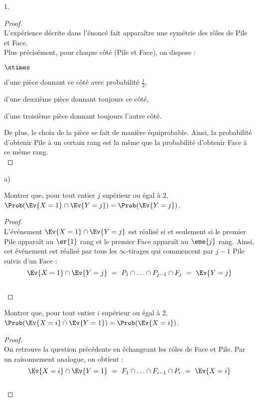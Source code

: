 \begin{noliste}{1.}
  \begin{proof}~\\%
    L'expérience décrite dans l'énoncé fait apparaître une symétrie
    des rôles de Pile et Face.\\
    Plus précisément, pour chaque côté (Pile et Face), on dispose :
    \begin{noliste}{$\stimes$}
    \item d'une pièce donnant ce côté avec probabilité $\frac{1}{2}$,
    \item d'une deuxième pièce donnant toujours ce côté,
    \item d'une troisième pièce donnant toujours l'autre côté.
    \end{noliste}
    De plus, le choix de la pièce se fait de manière
    équiprobable. Ainsi, la probabilité d'obtenir Pile à un certain
    rang est la même que la probabilité d'obtenir Face à ce même
    rang.%
    ~\\[-1cm]
  \end{proof}

\item
  \begin{noliste}{a)}
    \setlength{\itemsep}{2mm}
  \item Montrer que, pour tout entier $j$ supérieur ou égal à $2$,
    $\Prob(\Ev{X = 1} \cap \Ev{Y = j}) = \Prob(\Ev{Y = j})$.

    \begin{proof}~\\%
      L'événement $\Ev{X = 1} \cap \Ev{Y = j}$ est réalisé si et
      seulement si le premier Pile apparaît au $\er{1}$ rang et le
      premier Face apparaît au $\eme{j}$ rang. Ainsi, cet événement
      est réalisé par tous les $\infty$-tirages qui commencent par
      $j-1$ Pile suivis d'un Face :
      \[
      \Ev{X = 1} \cap \Ev{Y = j} \ = \ P_1 \cap \ldots \cap P_{j-1}
      \cap F_j \ = \ \Ev{Y = j}
      \]
      ~\\[-1cm]
    \end{proof}

  \item Montrer que, pour tout entier $i$ supérieur ou égal à $2$,
    $\Prob(\Ev{X = i} \cap \Ev{Y = 1}) = \Prob(\Ev{X = i})$.

    \begin{proof}~\\%
      On retrouve la question précédente en échangeant les rôles de
      Face et Pile. Par un raisonnement analogue, on obtient :
      \[
      \Ev{X = i} \cap \Ev{Y = 1} \ = \ F_1 \cap \ldots \cap F_{i-1}
      \cap P_i \ = \ \Ev{X = i}
      \]
      ~\\[-1cm]
    \end{proof}
  \end{noliste}


\end{noliste}
